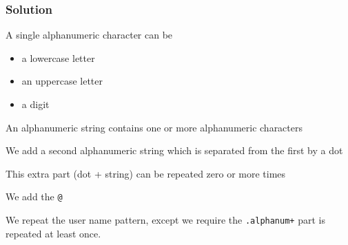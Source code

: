 \begin{frame}
  \frametitle{Solution}
  \begin{center}\ttfamily\small
  \end{center}
  \vskip5mm
  \vskip2mm
  \begin{overprint}
    \begin{center}
      A single alphanumeric character can be
      \begin{itemize}
        \item a lowercase letter
        \item an uppercase letter
        \item a digit
      \end{itemize}
    \end{center}

    \begin{center}
      An alphanumeric string contains one or more alphanumeric characters
    \end{center}

    \begin{center}
      We add a second alphanumeric string which is separated from the first by a dot
    \end{center}

    \begin{center}
      This extra part (dot + string) can be repeated zero or more times
    \end{center}

    \begin{center}
      We add the \texttt{@}
    \end{center}

    \begin{center}
      We repeat the user name pattern, except we require the \texttt{.alphanum+} part
      is repeated at least once.
    \end{center}
  \end{overprint}
\end{frame}

